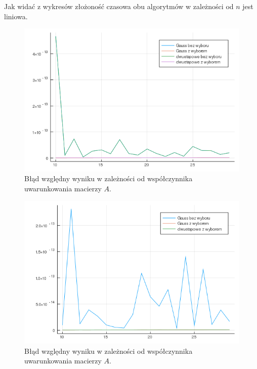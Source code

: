 \documentclass{article}
\begin{document}
Jak widać z wykresów złożoność czasowa obu algorytmów w zależności od $n$ jest liniowa.\\
\begin{figure}[H]
	\includegraphics[width=\linewidth]{precision_cond.png}
	\caption{Błąd względny wyniku w zależności od współczynnika uwarunkowania macierzy $A$.}
	\label{fig:asdf}
\end{figure}
\begin{figure}[H]
	\includegraphics[width=\linewidth]{precision_cond_2.png}
	\caption{Błąd względny wyniku w zależności od współczynnika uwarunkowania macierzy $A$.}
	\label{fig:asdf}
\end{figure}
\end{document}
